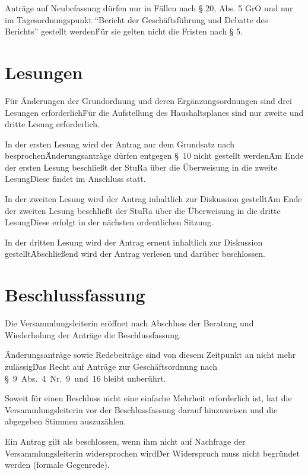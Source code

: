 \begin{multicols}{2}
\Abs \Satz Anträge auf Neubefassung dürfen nur in Fällen nach § 20, Abs. 5 GrO und nur im Tagesordnungspunkt "`Bericht der Geschäftsführung und Debatte des Berichts"' gestellt werden\. Für sie gelten nicht die Fristen nach § 5.



\section{Lesungen}

\Abs \Satz Für Änderungen der Grundordnung und deren Ergänzungsordnungen sind drei Lesungen erforderlich\. Für die Aufstellung des Haushaltsplanes sind nur zweite und dritte Lesung erforderlich.

\Abs \Satz In der ersten Lesung wird der Antrag nur dem Grundsatz nach besprochen\.  Änderungsanträge dürfen entgegen §~10 nicht gestellt werden\. Am Ende der ersten Lesung beschließt der StuRa über die Überweisung in die zweite Lesung\. Diese findet im Anschluss statt.

\Abs \Satz In der zweiten Lesung wird der Antrag inhaltlich zur Diskussion gestellt\. Am Ende der zweiten Lesung beschließt der StuRa über die Überweisung in die dritte Lesung\. Diese erfolgt in der nächsten ordentlichen Sitzung.

\Abs \Satz In der dritten Lesung wird der Antrag erneut inhaltlich zur Diskussion gestellt\. Abschließend wird der Antrag verlesen und darüber beschlossen.



\section{Beschlussfassung}

\Abs \Satz Die Versammlungsleiterin eröffnet nach Abschluss der Beratung und Wiederholung der Anträge die Beschlussfassung.

\Abs \Satz Änderungsanträge sowie Redebeiträge sind von diesem Zeitpunkt an nicht mehr zulässig\. Das Recht auf Anträge zur Geschäftsordnung nach §~9~Abs.~4~Nr.~9~und~16 bleibt unberührt.

\Abs \Satz Soweit für einen Beschluss nicht eine einfache Mehrheit erforderlich ist, hat die Versammlungsleiterin vor der Beschlussfassung darauf hinzuweisen und die abgegeben Stimmen auszuzählen.

\Abs \Satz Ein Antrag gilt als beschlossen, wenn ihm nicht auf Nachfrage der Versammlungsleiterin widersprochen wird\. Der Widerspruch muss nicht begründet werden (formale Gegenrede).


\end{multicols}
